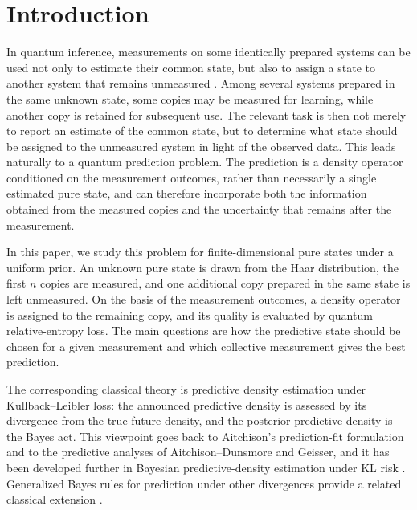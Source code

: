 \documentclass[journal]{IEEEtran}
\begin{document}
\section{Introduction}
In quantum inference, measurements on some identically prepared systems can be
used not only to estimate their common state, but also to assign a state to
another system that remains unmeasured
\cite{SchackBrunCaves2001QuantumBayes,TanakaKomaki2005BayesianPredictive}.
Among several systems prepared in the same unknown state, some copies may be
measured for learning, while another copy is retained for subsequent use.  The
relevant task is then not merely to report an estimate of the common state, but
to determine what state should be assigned to the unmeasured system in light of
the observed data.  This leads naturally to a quantum prediction problem.  The
prediction is a density operator conditioned on the measurement outcomes,
rather than necessarily a single estimated pure state, and can therefore
incorporate both the information obtained from the measured copies and the
uncertainty that remains after the measurement.

In this paper, we study this problem for finite-dimensional pure states under a
uniform prior.  An unknown pure state is drawn from the Haar distribution, the
first \(n\) copies are measured, and one additional copy prepared in the same
state is left unmeasured.  On the basis of the measurement outcomes, a density
operator is assigned to the remaining copy, and its quality is evaluated by
quantum relative-entropy loss.  The main questions are how the predictive state
should be chosen for a given measurement and which collective measurement gives
the best prediction.

The corresponding classical theory is predictive density estimation under
Kullback--Leibler loss: the announced predictive density is assessed by its
divergence from the true future density, and the posterior predictive density
is the Bayes act.  This viewpoint goes back to Aitchison's prediction-fit
formulation and to the predictive analyses of Aitchison--Dunsmore and Geisser,
and it has been developed further in Bayesian predictive-density estimation
under KL risk
\cite{Aitchison1975PredictionFit,AitchisonDunsmore1975Prediction,Geisser1993Predictive,Komaki2006ShrinkagePrediction,GeorgeLiangXu2006PredictiveKL}.
Generalized Bayes rules for prediction under other divergences provide a related
classical extension \cite{CorcueraGiummole1999Prediction}.
\end{document}
